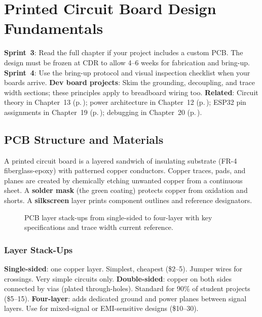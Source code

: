 \chapter{Printed Circuit Board Design Fundamentals}\label{ch:pcb}

\begin{tipbox}
\textbf{Sprint~3}: Read the full chapter if your project includes a custom PCB. The design must be frozen at CDR to allow 4--6 weeks for fabrication and bring-up. \textbf{Sprint~4}: Use the bring-up protocol and visual inspection checklist when your boards arrive. \textbf{Dev board projects}: Skim the grounding, decoupling, and trace width sections; these principles apply to breadboard wiring too. \textbf{Related}: Circuit theory in Chapter~13 (p.\,\pageref{ch:electronics}); power architecture in Chapter~12 (p.\,\pageref{ch:power}); ESP32 pin assignments in Chapter~19 (p.\,\pageref{ch:mcu}); debugging in Chapter~20 (p.\,\pageref{ch:debug}).
\end{tipbox}

\vspace{1em}
\section{PCB Structure and Materials}

A printed circuit board is a layered sandwich of insulating substrate (FR-4 fiberglass-epoxy) with patterned copper conductors. Copper traces, pads, and planes are created by chemically etching unwanted copper from a continuous sheet. A \textbf{solder mask} (the green coating) protects copper from oxidation and shorts. A \textbf{silkscreen} layer prints component outlines and reference designators.

\begin{figure}[htbp]\centering

\caption{PCB layer stack-ups from single-sided to four-layer with key specifications and trace width current reference.}\label{fig:stack}
\end{figure}

\subsection{Layer Stack-Ups}
\textbf{Single-sided}: one copper layer. Simplest, cheapest (\$2--5). Jumper wires for crossings. Very simple circuits only. \textbf{Double-sided}: copper on both sides connected by vias (plated through-holes). Standard for 90\% of student projects (\$5--15). \textbf{Four-layer}: adds dedicated ground and power planes between signal layers. Use for mixed-signal or EMI-sensitive designs (\$10--30).

